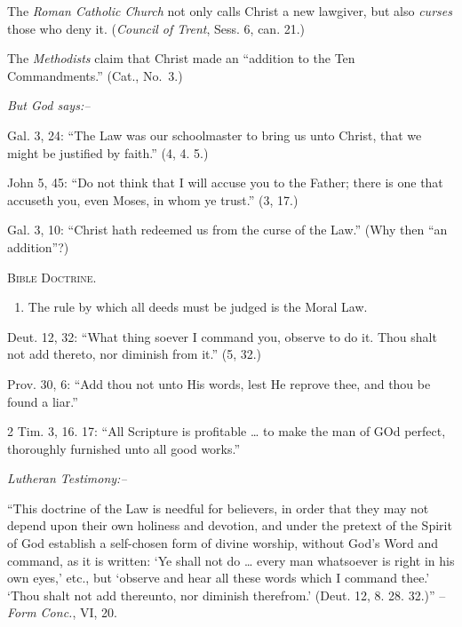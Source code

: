 \documentclass[
]{book}
\providecommand{\tightlist}{%
  \setlength{\itemsep}{0pt}\setlength{\parskip}{0pt}}
\begin{document}
The \emph{Roman Catholic Church} not only calls Christ a new lawgiver, but also \emph{curses} those who deny it. (\emph{Council of Trent}, Sess. 6, can. 21.)

The \emph{Methodists} claim that Christ made an ``addition to the Ten Commandments.'' (Cat., No.~3.)

\begin{center}
\textsl{But God says:--}
\end{center}

Gal. 3, 24: ``The Law was our schoolmaster to bring us unto Christ, that we might be justified by faith.'' (4, 4. 5.)

John 5, 45: ``Do not think that I will accuse you to the Father; there is one that accuseth you, even Moses, in whom ye trust.'' (3, 17.)

Gal. 3, 10: ``Christ hath redeemed us from the curse of the Law.'' (Why then ``an addition''?)

\begin{center}
\textsc{Bible Doctrine.}
\end{center}

\begin{enumerate}
\def\labelenumi{\alph{enumi}.}
\setcounter{enumi}{3}
\tightlist
\item
  The rule by which all deeds must be judged is the Moral Law.
\end{enumerate}

Deut. 12, 32: ``What thing soever I command you, observe to do it. Thou shalt not add thereto, nor diminish from it.'' (5, 32.)

Prov. 30, 6: ``Add thou not unto His words, lest He reprove thee, and thou be found a liar.''

2 Tim. 3, 16. 17: ``All Scripture is profitable \ldots{} to make the man of GOd perfect, thoroughly furnished unto all good works.''

\begin{center}
\textsl{Lutheran Testimony:--}
\end{center}

``This doctrine of the Law is needful for believers, in order that they may not depend upon their own holiness and devotion, and under the pretext of the Spirit of God establish a self-chosen form of divine worship, without God's Word and command, as it is written: `Ye shall not do \ldots{} every man whatsoever is right in his own eyes,' etc., but `observe and hear all these words which I command thee.' `Thou shalt not add thereunto, nor diminish therefrom.' (Deut. 12, 8. 28. 32.)'' -- \emph{Form Conc.}, VI, 20.
\end{document}
